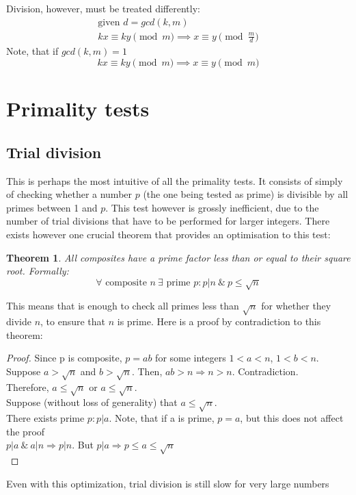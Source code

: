 \documentclass[12pt]{article}
\newtheorem{theorem}{Theorem}
\begin{document}
        Division, however, must be treated differently:
        \begin{gather*}
            \text{given } d = gcd(k, m)\\
            kx \equiv ky \pmod{m} \implies x \equiv y \pmod{\frac{m}{d}}
        \end{gather*}
        Note, that if $gcd(k, m) = 1$ 
        \begin{equation*}
            kx \equiv ky \pmod{m} \implies x \equiv y \pmod{m}
        \end{equation*}


\section{Primality tests}
    \subsection{Trial division}

    This is perhaps the most intuitive of all the primality tests. It consists
    of simply of checking whether a number $p$ (the one being tested as prime)
    is divisible by all primes between 1 and $p$. This test however is grossly
    inefficient, due to the number of trial divisions that have to be performed
    for larger integers. There exists however one crucial theorem that provides
    an optimisation to this test:
    \begin{theorem}
        All composites have a prime factor less than or equal to their square
        root. Formally:\\
        $$\forall \text{ composite } n \: \exists \text{ prime } p:p|n \: \& \: p \leq \sqrt{n}$$
    \end{theorem}
    This means that is enough to check all primes less than $\sqrt{n}$ for
    whether they divide $n$, to ensure that $n$ is prime. Here is a proof by
    contradiction to this theorem:
    \begin{proof}
    Since p is composite, $p=ab$ for some integers $1<a<n$, $1<b<n$.\\
    Suppose $a>\sqrt{n}$ and $b>\sqrt{n}$. Then, $ab>n \Rightarrow n>n$. Contradiction.\\
    Therefore, $a \leq \sqrt{n}$ or $a \leq \sqrt{n}$. \\
    Suppose (without loss of generality) that $a \leq \sqrt{n}$.\\
    There exists prime $p: p|a$. Note, that if a is prime, $p = a$, but this
    does not affect the proof\\
    $p|a\:\&\:a|n \Rightarrow p|n$. But $p|a \Rightarrow p \leq a \leq \sqrt{n}$\\
    \end{proof}
    Even with this optimization, trial division is still slow for very large
    numbers 
\end{document}
